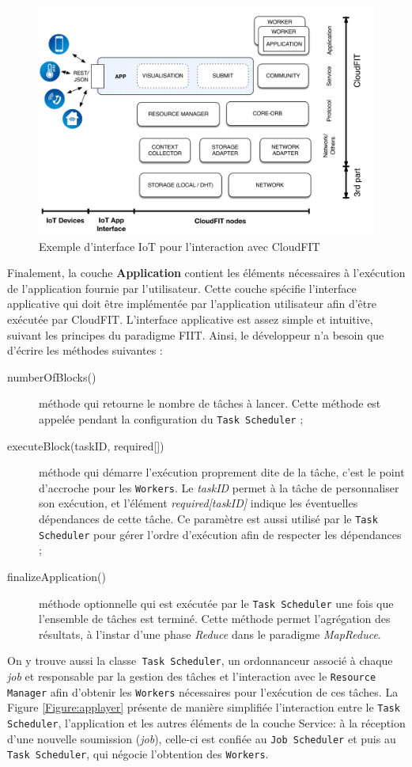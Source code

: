 \begin{figure}
	\centering
		\includegraphics[width=0.65\linewidth]{img/CloudFITstack-IoT}
		\caption{Exemple d'interface IoT pour l'interaction avec CloudFIT}\label{fig:cloudFitStackIoT}
\end{figure}


Finalement, la couche \textbf{Application} contient les éléments nécessaires à l'exécution de l'application fournie par l'utilisateur. Cette couche spécifie l'interface applicative qui doit être implémentée par l'application utilisateur afin d'être exécutée par CloudFIT. L'interface applicative est assez simple et intuitive, suivant les principes du paradigme FIIT. Ainsi, le développeur n'a besoin que d'écrire les méthodes suivantes :
\begin{description}
	\item [numberOfBlocks()] méthode qui retourne le nombre de tâches à lancer. Cette méthode est appelée pendant la configuration du \texttt{Task Scheduler} ;
	\item [executeBlock(taskID, required{[]}) ] méthode qui démarre l'exécution proprement dite de la tâche, c'est le point d'accroche pour les \texttt{Workers}. Le \textit{taskID} permet à la tâche de personnaliser son exécution, et l'élément \textit{required[taskID]} indique les éventuelles dépendances de cette tâche. Ce paramètre est aussi utilisé par le \texttt{Task Scheduler} pour gérer l'ordre d'exécution afin de respecter les dépendances ;
	\item [finalizeApplication()] méthode optionnelle qui est exécutée par le \texttt{Task Scheduler} une fois que l'ensemble de tâches est terminé. Cette méthode permet l'agrégation des résultats, à l'instar d'une phase \textit{Reduce} dans le paradigme \textit{MapReduce}.
\end{description}

On y trouve aussi la classe\texttt{ Task Scheduler}, un ordonnanceur associé à chaque \textit{job} et responsable par la gestion des tâches et l'interaction avec le \texttt{Resource Manager} afin d'obtenir les \texttt{Workers} nécessaires pour l'exécution de ces tâches. La Figure \ref{Figure:applayer} présente de manière simplifiée l'interaction entre le \texttt{Task Scheduler}, l'application et les autres éléments de la couche Service: à la réception d'une nouvelle soumission (\textit{job}), celle-ci est confiée au \texttt{Job Scheduler} et puis au \texttt{Task Scheduler}, qui négocie l'obtention des \texttt{Workers}.   

